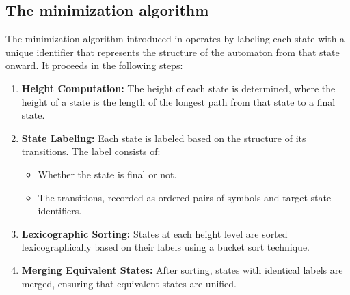 \subsection{The minimization algorithm}
The minimization algorithm introduced in \cite{revuz1992minimisation} operates by labeling each state with a unique identifier that represents the structure of the automaton from that state onward. It proceeds in the following steps:

\begin{enumerate}
    \item \textbf{Height Computation:} The height of each state is determined, where the height of a state is the length of the longest path from that state to a final state.
    \item \textbf{State Labeling:} Each state is labeled based on the structure of its transitions. The label consists of:
    \begin{itemize}
        \item Whether the state is final or not.
        \item The transitions, recorded as ordered pairs of symbols and target state identifiers.
    \end{itemize}
    \item \textbf{Lexicographic Sorting:} States at each height level are sorted lexicographically based on their labels using a bucket sort technique.
    \item \textbf{Merging Equivalent States:} After sorting, states with identical labels are merged, ensuring that equivalent states are unified.
\end{enumerate}
